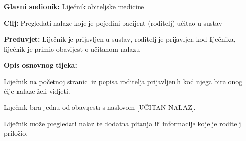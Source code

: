 					\noindent {}
					\begin{packed_item}
						
						\item \textbf{Glavni sudionik: }Liječnik obiteljske medicine
						\item  \textbf{Cilj:} Pregledati nalaze koje je pojedini pacijent (roditelj) učitao u sustav
						\item  \textbf{Preduvjet:} Liječnik je prijavljen u sustav, roditelj je prijavljen kod liječnika, liječnik je primio obavijest o učitanom nalazu
						\item  \textbf{Opis osnovnog tijeka:}
						
						\item[] \begin{packed_enum}
							
							\item Liječnik na početnoj stranici iz popisa roditelja prijavljenih kod njega bira onog čije nalaze želi vidjeti.
							\item Liječnik bira jednu od obavijesti s naslovom [UČITAN NALAZ].
							\item Liječnik može pregledati nalaz te dodatna pitanja ili informacije koje je roditelj priložio.
						\end{packed_enum}
						
						
					\end{packed_item}
					
